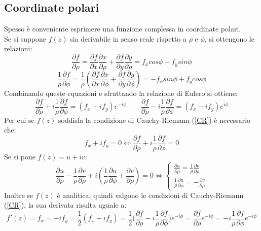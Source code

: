 \documentclass[twoside]{article}
\begin{document}
	\subsection{Coordinate polari}
	Spesso è conveniente esprimere una funzione complessa in coordinate polari.\\
	Se si suppone $f(z)$ sia derivabile in senso reale rispetto a $\rho$ e $\phi$, si ottengono le relazioni:
	\begin{equation}
		\frac{\partial f}{\partial\rho}=\frac{\partial f}{\partial x}\frac{\partial x}{\partial\rho}+\frac{\partial f}{\partial y}\frac{\partial y}{\partial\rho}=f_xcos\phi+f_ysin\phi
	\end{equation}
	\begin{equation}
		\frac{1}{\rho}\frac{\partial f}{\partial\phi}=\frac{1}{\rho}\left(\frac{\partial f}{\partial x}\frac{\partial x}{\partial\phi}+\frac{\partial f}{\partial y}\frac{\partial y}{\partial\phi}\right)=-f_xsin\phi+f_ycos\phi
	\end{equation}
	Combinando queste equazioni e sfruttando la relazione di Eulero si ottiene:
	\begin{equation}
	\frac{\partial f}{\partial\rho}+i\frac{1}{\rho}\frac{\partial f}{\partial\phi}=(f_x+if_y)e^{-i\phi} \qquad \frac{\partial f}{\partial\rho}-i\frac{1}{\rho}\frac{\partial f}{\partial\phi}=(f_x-if_y)e^{i\phi}
	\end{equation}
	Per cui se $f(z)$ soddisfa la condizione di Cauchy-Riemann (\ref{CR}) è necessario che:
	\begin{equation}
	f_x+if_y=0\Longleftrightarrow \frac{\partial f}{\partial\rho}+i\frac{1}{\rho}\frac{\partial f}{\partial\phi}=0
	\end{equation}
	Se si pone $f(z)=u+iv$:
	\begin{equation}
		\frac{\partial u}{\partial\rho}-\frac{1}{\rho}\frac{\partial v}{\partial \rho}+i\left(\frac{1}{\rho}\frac{\partial u}{\partial \phi}+\frac{\partial v}{\partial\rho}\right)=0 \Longleftrightarrow \begin{cases} \frac{\partial u}{\partial\rho}=\frac{1}{\rho}\frac{\partial v}{\partial \rho}\\
		\frac{1}{\rho}\frac{\partial u}{\partial \phi}=-\frac{\partial v}{\partial\rho}\end{cases}
	\end{equation}
	Inoltre se $f(z)$ è analitica, quindi valgono le condizioni di Cauchy-Riemann (\ref{CR}), la sua derivata risulta uguale a:
	\begin{equation}
	f'(z)=f_x=-if_y=\frac{1}{2}(f_x-if_y)=\frac{1}{2}\biggl(\frac{\partial f}{\partial\rho}-i\frac{1}{\rho}\frac{\partial f}{\partial\phi}\biggr)e^{-i\phi}=\frac{\partial f}{\partial\rho}e^{-i\phi}=-i\frac{1}{\rho}\frac{\partial f}{\partial\phi}e^{-i\phi}
	\end{equation}
	
\end{document}

